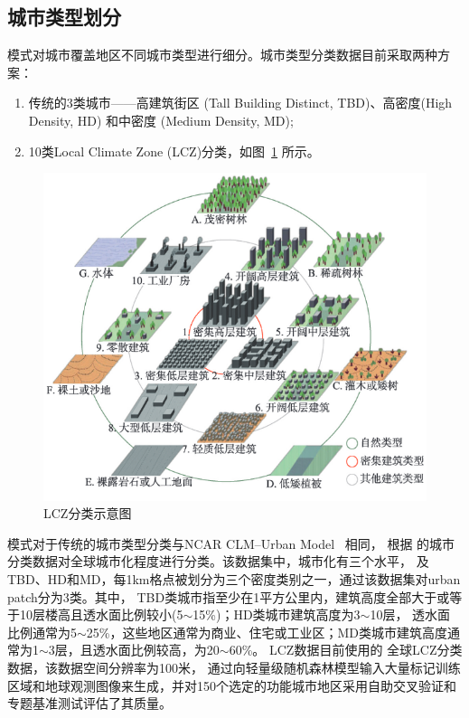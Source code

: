 \subsection{城市类型划分}\label{城市类型划分}
模式对城市覆盖地区不同城市类型进行细分。城市类型分类数据目前采取两种方案：
\begin{enumerate}
    \item 传统的3类城市——高建筑街区 (Tall Building Distinct, TBD)、高密度(High Density, HD) 和中密度 (Medium Density, MD);
    \item 10类Local Climate Zone (LCZ)分类，如图~\ref{fig:LCZ分类图示}  所示。
\end{enumerate}
{
\begin{figure}[]
\centering
\includegraphics{Figures/基础数据/LCZ分类图示.png}
\caption{LCZ分类示意图}
\label{fig:LCZ分类图示}
\end{figure}
}


模式对于传统的城市类型分类与NCAR CLM--Urban Model~\citep{oleson2020parameterization} 相同，
根据 \citet{jackson2013parameterization} 的城市分类数据对全球城市化程度进行分类。该数据集中，城市化有三个水平，
及TBD、HD和MD，每1km格点被划分为三个密度类别之一，通过该数据集对urban patch分为3类。其中，
TBD类城市指至少在1平方公里内，建筑高度全部大于或等于10层楼高且透水面比例较小(5$\sim$15\%)；HD类城市建筑高度为3$\sim$10层，
透水面比例通常为5$\sim$25\%，这些地区通常为商业、住宅或工业区；MD类城市建筑高度通常为1$\sim$3层，且透水面比例较高，为20$\sim$60\%。
LCZ数据目前使用的 \citet{demuzere2022global} 全球LCZ分类数据，该数据空间分辨率为100米，
通过向轻量级随机森林模型输入大量标记训练区域和地球观测图像来生成，并对150个选定的功能城市地区采用自助交叉验证和专题基准测试评估了其质量。


